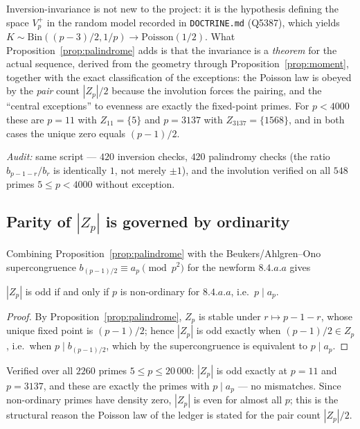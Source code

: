 Inversion-invariance is not new to the project: it is the hypothesis defining the space
$V_p^+$ in the random model recorded in \texttt{DOCTRINE.md} (Q5387), which yields
$K\sim\mathrm{Bin}((p-3)/2,1/p)\to\mathrm{Poisson}(1/2)$.  What
Proposition~\ref{prop:palindrome} adds is that the invariance is a \emph{theorem} for the
actual sequence, derived from the geometry through Proposition~\ref{prop:moment}, together
with the exact classification of the exceptions: the Poisson law is obeyed by the
\emph{pair} count $|Z_p|/2$ because the involution forces the pairing, and the
``central exceptions'' to evenness are exactly the fixed-point primes.  For $p<4000$ these
are $p=11$ with $Z_{11}=\{5\}$ and $p=3137$ with $Z_{3137}=\{1568\}$, and in both cases the
unique zero equals $(p-1)/2$.

\noindent
\emph{Audit:} same script — $420$ inversion checks, $420$ palindromy checks (the ratio
$b_{p-1-r}/b_r$ is identically $1$, not merely $\pm1$), and the involution verified on all
$548$ primes $5\le p<4000$ without exception.

\subsection{Parity of $|Z_p|$ is governed by ordinarity}

Combining Proposition~\ref{prop:palindrome} with the Beukers/Ahlgren--Ono supercongruence
$b_{(p-1)/2}\equiv a_p\pmod{p^2}$ for the newform $8.4.a.a$ gives

\begin{proposition}\label{prop:parity-ordinary}
$|Z_p|$ is odd if and only if $p$ is non-ordinary for $8.4.a.a$, i.e.\ $p\mid a_p$.
\end{proposition}

\begin{proof}
By Proposition~\ref{prop:palindrome}, $Z_p$ is stable under $r\mapsto p-1-r$, whose unique
fixed point is $(p-1)/2$; hence $|Z_p|$ is odd exactly when $(p-1)/2\in Z_p$, i.e.\ when
$p\mid b_{(p-1)/2}$, which by the supercongruence is equivalent to $p\mid a_p$.
\end{proof}

Verified over all $2260$ primes $5\le p\le20\,000$: $|Z_p|$ is odd exactly at $p=11$ and
$p=3137$, and these are exactly the primes with $p\mid a_p$ — no mismatches.  Since
non-ordinary primes have density zero, $|Z_p|$ is even for almost all $p$; this is the
structural reason the Poisson law of the ledger is stated for the pair count $|Z_p|/2$.

